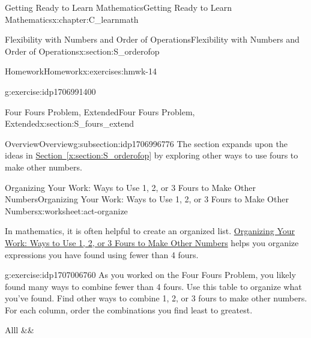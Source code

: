 \documentclass[oneside,10pt,]{book}
\newcommand{\tabularfont}{\relax}
\newcommand{\xreffont}{\relax}
\numberwithin{equation}{chapter}
\newcommand{\hrulethin}  {\noalign{\hrule height 0.04em}}
\begin{document}
\begin{chapterptx}{Getting Ready to Learn Mathematics}{}{Getting Ready to Learn Mathematics}{}{}{x:chapter:C_learnmath}
\begin{sectionptx}{Flexibility with Numbers and Order of Operations}{}{Flexibility with Numbers and Order of Operations}{}{}{x:section:S_orderofop}
\begin{exercises-subsection}{Homework}{}{Homework}{}{}{x:exercises:hmwk-14}
\begin{divisionexercise}{8}{}{}{g:exercise:idp1706991400}
\begin{enumerate}[font=\bfseries,label=(\alph*),ref=\alph*]
\end{enumerate}
\end{divisionexercise}%
\end{exercises-subsection}
\end{sectionptx}
%
%
\typeout{************************************************}
\typeout{************************************************}
%
\begin{sectionptx}{Four Fours Problem, Extended}{}{Four Fours Problem, Extended}{}{}{x:section:S_fours_extend}
%
%
\typeout{************************************************}
\typeout{************************************************}
%
\begin{subsectionptx}{Overview}{}{Overview}{}{}{g:subsection:idp1706996776}
The section expands upon the ideas in \hyperref[x:section:S_orderofop]{Section~{\xreffont\ref{x:section:S_orderofop}}} by exploring other ways to use fours to make other numbers.%
\end{subsectionptx}
%
%
\typeout{************************************************}
\typeout{************************************************}
%
\begin{worksheet-subsection}{Organizing Your Work: Ways to Use 1, 2, or 3 Fours to Make Other Numbers}{}{Organizing Your Work: Ways to Use 1, 2, or 3 Fours to Make Other Numbers}{}{}{x:worksheet:act-organize}
\begin{introduction}{}%
In mathematics, it is often helpful to create an organized list. \hyperref[x:worksheet:act-organize]{Organizing Your Work: Ways to Use 1, 2, or 3 Fours to Make Other Numbers} helps you organize expressions you have found using fewer than 4 fours.%
\end{introduction}%
\begin{divisionexercise}{1}{}{}{g:exercise:idp1707006760}%
As you worked on the Four Fours Problem, you likely found many ways to combine fewer than 4 fours. Use this table to organize what you've found. Find other ways to combine 1, 2, or 3 fours to make other numbers. For each column, order the combinations you find least to greatest.%
\begin{center}%
{\tabularfont%
\begin{tabular}{Alll}\hrulethin
{}&&\tabularnewline\hrulethin

\end{tabular}}
\end{center}
\end{divisionexercise}
\end{worksheet-subsection}
\end{sectionptx}
\end{chapterptx}
\end{document}
